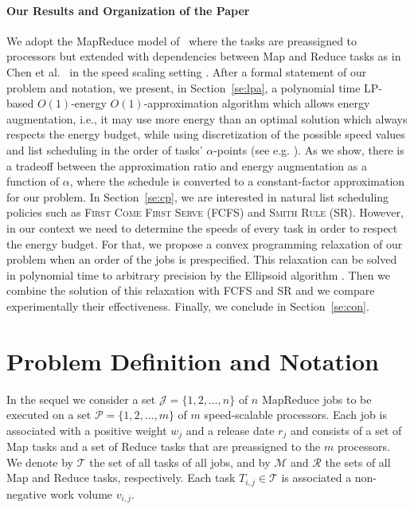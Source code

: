 \documentclass{llncs}
\newcommand{\fcfs}{\textsc{FCFS}\xspace}
\newcommand{\sr}{\textsc{SR}\xspace}
\begin{document}
\paragraph{Our Results and Organization of the Paper}
We adopt the MapReduce model of~\cite{ChangKKLLM11} where the tasks are preassigned to processors
but extended with dependencies between Map and Reduce tasks
as in Chen et al.~\cite{ChenKL12,MoseleyDKS11} in the speed scaling setting \cite{YaoDS95}.
After a formal statement of our problem and notation, we present, in Section~\ref{se:lpa}, a polynomial time LP-based $O(1)$-energy $O(1)$-approximation algorithm which allows energy augmentation, i.e., it may use more energy than an optimal solution which always respects the energy budget, while using discretization of the possible speed values and list scheduling in the order of tasks' $\alpha$-points (see e.g. \cite{PhillipsSW97,HallSW96,Skutella06}).
As we show, there is a tradeoff between the approximation ratio and energy augmentation as a function of $\alpha$, where the schedule is converted to a constant-factor approximation for our problem.
In Section~\ref{se:cp}, we are interested in natural list scheduling policies such as \textsc{First Come First Serve} (\fcfs) and \textsc{Smith Rule} (\sr). However, in our context we need to determine the speeds of every task in order to respect the energy budget. For that, we propose a convex programming relaxation of our problem when an order of the jobs is prespecified.
This relaxation can be solved in polynomial time to arbitrary precision by the Ellipsoid algorithm \cite{NesterovNN94}.
Then we combine the solution of this relaxation with  \fcfs and \sr and  we compare experimentally their effectiveness.
Finally, we conclude in Section~\ref{se:con}.

\section{Problem Definition and Notation}

In the sequel we consider a set $\mathcal{J}=\{1,2,\ldots,n\}$ of $n$ MapReduce jobs to be executed
on a set $\mathcal{P}=\{1,2,\ldots,m\}$ of $m$ speed-scalable processors.
Each job is associated with a positive weight $w_j$ and a release date $r_j$
and consists of a set of Map tasks and a set of Reduce tasks that are preassigned to the $m$ processors.
We denote by $\mathcal{T}$ the set of all tasks of all jobs,
and by $\mathcal{M}$ and $\mathcal{R}$ the sets of all Map and Reduce tasks, respectively.
Each task $T_{i,j} \in \mathcal{T}$ is associated a non-negative work volume $v_{i,j}$.
\end{document}
